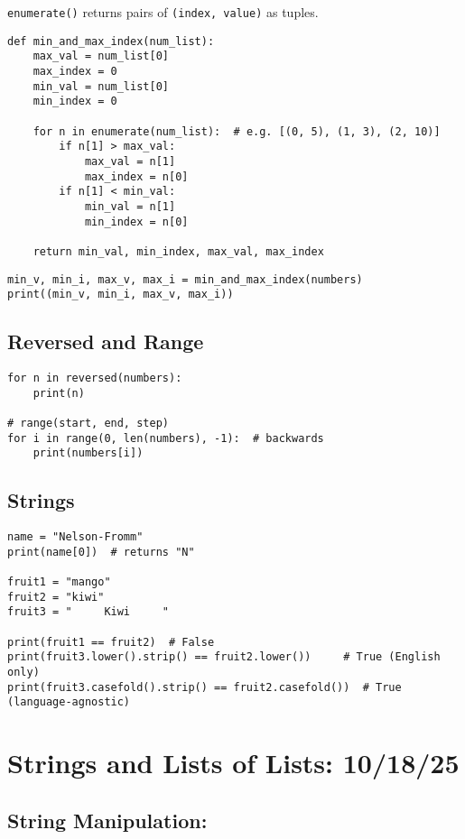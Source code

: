 \documentclass[11pt]{article}
\begin{document}
\texttt{enumerate()} returns pairs of \texttt{(index, value)} as tuples.

\begin{verbatim}
def min_and_max_index(num_list):
    max_val = num_list[0]
    max_index = 0
    min_val = num_list[0]
    min_index = 0

    for n in enumerate(num_list):  # e.g. [(0, 5), (1, 3), (2, 10)]
        if n[1] > max_val:
            max_val = n[1]
            max_index = n[0]
        if n[1] < min_val:
            min_val = n[1]
            min_index = n[0]

    return min_val, min_index, max_val, max_index
\end{verbatim}

\begin{verbatim}
min_v, min_i, max_v, max_i = min_and_max_index(numbers)
print((min_v, min_i, max_v, max_i))
\end{verbatim}

\subsection*{Reversed and Range}

\begin{verbatim}
for n in reversed(numbers):
    print(n)

# range(start, end, step)
for i in range(0, len(numbers), -1):  # backwards
    print(numbers[i])
\end{verbatim}

\subsection*{Strings}

\begin{verbatim}
name = "Nelson-Fromm"
print(name[0])  # returns "N"

fruit1 = "mango"
fruit2 = "kiwi"
fruit3 = "     Kiwi     "

print(fruit1 == fruit2)  # False
print(fruit3.lower().strip() == fruit2.lower())     # True (English only)
print(fruit3.casefold().strip() == fruit2.casefold())  # True (language-agnostic)
\end{verbatim}

\section{Strings and Lists of Lists: 10/18/25}

\subsection*{String Manipulation: }
\end{document}
